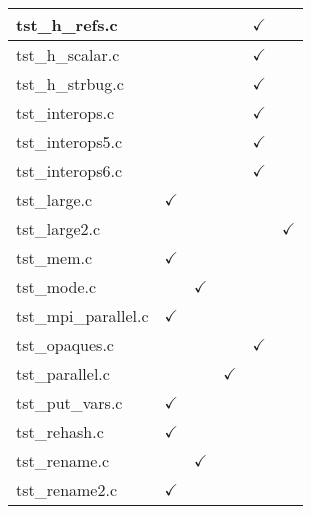 \begin{table}[H]
\begin{tabular}{|l|c|c|c|c|c|}
tst\_h\_refs.c          &               &               &               & $\checkmark$  &               \\ \hline
tst\_h\_scalar.c        &               &               &               & $\checkmark$  &               \\ \hline
tst\_h\_strbug.c        &               &               &               & $\checkmark$  &               \\ \hline
tst\_interops.c         &               &               &               & $\checkmark$  &               \\ \hline
tst\_interops5.c        &               &               &               & $\checkmark$  &               \\ \hline
tst\_interops6.c        &               &               &               & $\checkmark$  &               \\ \hline
tst\_large.c            & $\checkmark$  &               &               &               &               \\ \hline
tst\_large2.c           &               &               &               &               & $\checkmark$ \\ \hline
tst\_mem.c              & $\checkmark$  &               &               &               &               \\ \hline
tst\_mode.c             &               & $\checkmark$  &               &               &               \\ \hline
tst\_mpi\_parallel.c    & $\checkmark$  &               &               &               &               \\ \hline
tst\_opaques.c          &               &               &               & $\checkmark$  &               \\ \hline
tst\_parallel.c         &               &               & $\checkmark$  &               &               \\ \hline
tst\_put\_vars.c        & $\checkmark$  &               &               &               &               \\ \hline
tst\_rehash.c           & $\checkmark$  &               &               &               &               \\ \hline
tst\_rename.c           &               & $\checkmark$  &               &               &               \\ \hline
tst\_rename2.c          & $\checkmark$  &               &               &               &               \\ \hline

\end{tabular}
\end{table}
